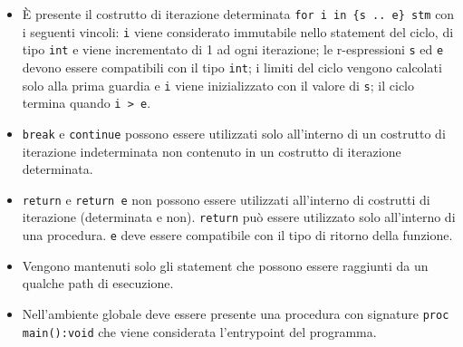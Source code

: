 \documentclass{report}
\newcommand{\term}[1]{\texttt{#1}}
\begin{document}
\begin {itemize}
\begin{itemize}
    \end{itemize}

    La dimensione di un array deve essere una r-espressione valutabile a compile-time.

    Le costanti (\term{param}) sono considerate immutabili e definite a compile-time.
    Devono essere inizializzate solo da letterali o da r-espressioni valutabili
    a compile-time.

    Variabili e costanti sono visibili dal punto di dichiarazione fino alla fine
    del blocco, le funzioni sono visibili ovunque (nell'ambiente di dichiarazione
    e nei blocchi al suo interno).

    Le funzioni (non procedure) devono ammettere un return in ogni path di esecuzione
    possibile.

    \item È presente il costrutto di iterazione determinata \texttt{for i in \{s .. e\}~stm}
    con i seguenti vincoli: \texttt{i} viene considerato immutabile nello statement del ciclo,
    di tipo \term{int} e viene incrementato di 1 ad ogni iterazione; le r-espressioni \texttt{s} ed
    \texttt{e} devono essere 
    compatibili con il tipo \term{int}; i limiti del ciclo vengono calcolati solo alla prima guardia
    e \texttt{i} viene inizializzato con il valore di \texttt{s}; il ciclo termina quando
    \texttt{i > e}.

    \item \texttt{break} e \texttt{continue} possono essere utilizzati solo all'interno
    di un costrutto di iterazione indeterminata non contenuto in un costrutto di iterazione determinata.

    \item \texttt{return} e \texttt{return e} non possono essere utilizzati all'interno
    di costrutti di iterazione (determinata e non). \texttt{return} può essere utilizzato
    solo all'interno di una procedura. \texttt{e} deve essere compatibile con
    il tipo di ritorno della funzione.

    \item Vengono mantenuti solo gli statement che possono essere raggiunti da un qualche path di esecuzione.

    \item Nell'ambiente globale deve essere presente una procedura con signature
        \texttt{proc main():void} che viene considerata l'entrypoint del programma.

\end {itemize}
\end{document}
